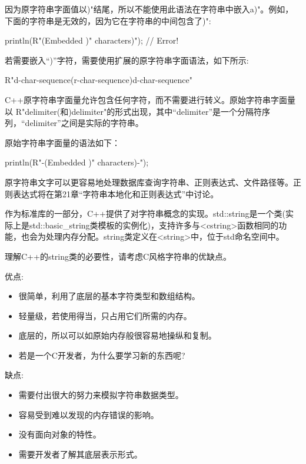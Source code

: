 因为原字符串字面值以)"结尾，所以不能使用此语法在字符串中嵌入a)"。例如，下面的字符串是无效的，因为它在字符串的中间包含了)":

\begin{cpp}
println(R"(Embedded )" characters)"); // Error!
\end{cpp}

若需要嵌入“)”字符，需要使用扩展的原字符串字面语法，如下所示:

\begin{cpp}
R"d-char-sequence(r-char-sequence)d-char-sequence"
\end{cpp}

C++原字符串字面量允许包含任何字符，而不需要进行转义。原始字符串字面量以 R"delimiter(和)delimiter"的形式出现，其中“delimiter”是一个分隔符序列，“delimiter”之间是实际的字符串。

原始字符串字面量的语法如下：

\begin{cpp}
println(R"-(Embedded )" characters)-");
\end{cpp}

原字符串文字可以更容易地处理数据库查询字符串、正则表达式、文件路径等。正则表达式将在第21章“字符串本地化和正则表达式”中讨论。


作为标准库的一部分，C++提供了对字符串概念的实现。std::string是一个类(实际上是std::basic\_string类模板的实例化)，支持许多与<cstring>函数相同的功能，也会为处理内存分配。string类定义在<string>中，位于std命名空间中。


理解C++的string类的必要性，请考虑C风格字符串的优缺点。

优点:

\begin{itemize}
\item
很简单，利用了底层的基本字符类型和数组结构。

\item
轻量级，若使用得当，只占用它们所需的内存。

\item
底层的，所以可以如原始内存般很容易地操纵和复制。

\item
若是一个C开发者，为什么要学习新的东西呢?
\end{itemize}

缺点:

\begin{itemize}
\item
需要付出很大的努力来模拟字符串数据类型。

\item
容易受到难以发现的内存错误的影响。

\item
没有面向对象的特性。

\item
需要开发者了解其底层表示形式。
\end{itemize}

